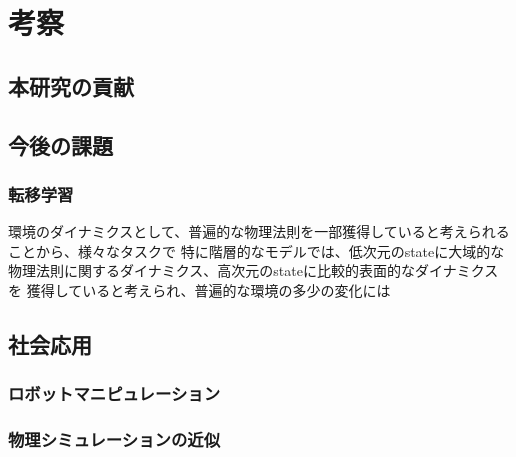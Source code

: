 \chapter{考察}
\label{chap:discussion}

\section{本研究の貢献}

\section{今後の課題}
\subsection{転移学習}
環境のダイナミクスとして、普遍的な物理法則を一部獲得していると考えられることから、様々なタスクで
特に階層的なモデルでは、低次元のstateに大域的な物理法則に関するダイナミクス、高次元のstateに比較的表面的なダイナミクスを
獲得していると考えられ、普遍的な環境の多少の変化には

\section{社会応用}
\subsection{ロボットマニピュレーション}
\subsection{物理シミュレーションの近似}
